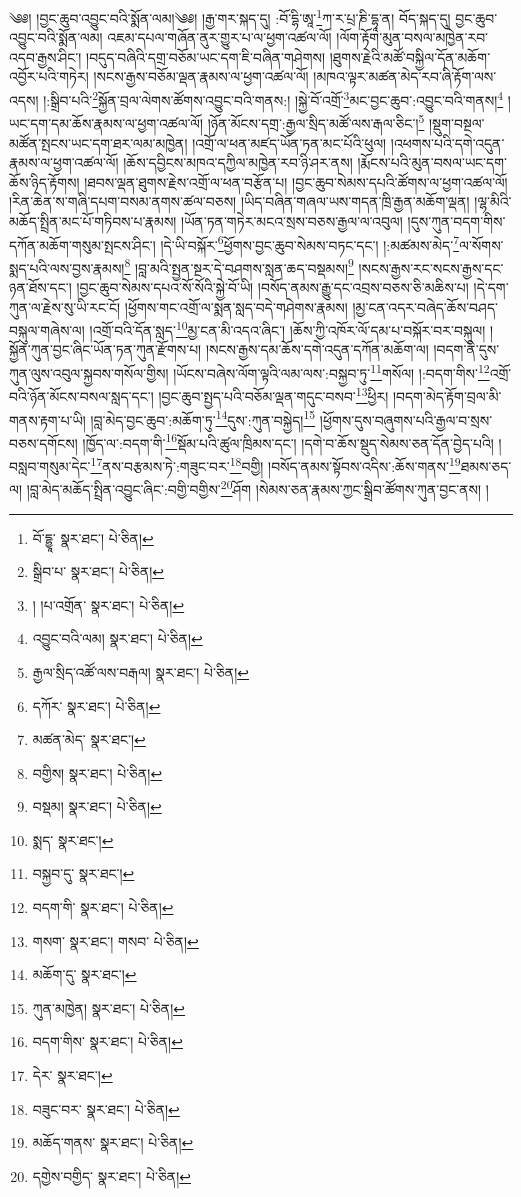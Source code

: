 \setcounter{footnote}{0} 
༄༅། །བྱང་ཆུབ་འབྱུང་བའི་སྨོན་ལམ།༄༅། །རྒྱ་གར་སྐད་དུ། :བོ་དྷི་ཨཱ་\footnote{བོ་དྷྱཱ་  སྣར་ཐང་།  པེ་ཅིན། }ཀ་ར་པྲ་ཎི་དྷཱ་ན། བོད་སྐད་དུ། བྱང་ཆུབ་འབྱུང་བའི་སྨོན་ལམ། འཇམ་དཔལ་གཞོན་ནུར་གྱུར་པ་ལ་ཕྱག་འཚལ་ལོ། །ལོག་རྟོག་མུན་བསལ་མཁྱེན་རབ་འདབ་རྒྱས་ཤིང་། །བདུད་བཞིའི་དགྲ་བཅོམ་ཡང་དག་ཇི་བཞིན་གཤེགས། །ཐུགས་རྗེའི་མཚོ་བསྐྱིལ་དོན་མཆོག་འབྱོར་པའི་གཏེར། །སངས་རྒྱས་བཅོམ་ལྡན་རྣམས་ལ་ཕྱག་འཚལ་ལོ། །མཁའ་ལྟར་མཚན་མེད་རབ་ཞི་རྟོག་ལས་འདས། །:སྒྲིབ་པའི་\footnote{སྒྲིབ་པ་  སྣར་ཐང་།  པེ་ཅིན། }སྐྱོན་བྲལ་ལེགས་ཚོགས་འབྱུང་བའི་གནས:། །སྐྱེ་བོ་འགྲོ་\footnote{། །པ་འགྲོན་  སྣར་ཐང་།  པེ་ཅིན། }མང་བྱང་ཆུབ་:འབྱུང་བའི་གནས།\footnote{འབྱུང་བའི་ལམ།  སྣར་ཐང་།  པེ་ཅིན། } །ཡང་དག་དམ་ཆོས་རྣམས་ལ་ཕྱག་འཚལ་ལོ། །ཉོན་མོངས་དགྲ་:རྒྱལ་སྲིད་མཚོ་ལས་རྒལ་ཅིང་།\footnote{རྒྱལ་སྲིད་འཚོ་ལས་བརྒལ།  སྣར་ཐང་།  པེ་ཅིན། } །སྡུག་བསྔལ་མཚོན་སྤངས་ཡང་དག་ཐར་ལམ་མཁྱེན། །འགྲོ་ལ་ཕན་མཛད་ཡོན་ཏན་མང་པོའི་ཕུལ། །འཕགས་པའི་དགེ་འདུན་རྣམས་ལ་ཕྱག་འཚལ་ལོ། །ཆོས་དབྱིངས་མཁའ་དཀྱིལ་མཁྱེན་རབ་ཉི་ཤར་ནས། །རྨོངས་པའི་མུན་བསལ་ཡང་དག་ཆོས་ཉིད་རྟོགས། །ཐབས་ལྡན་ཐུགས་རྗེས་འགྲོ་ལ་ཕན་བརྩོན་པ། །བྱང་ཆུབ་སེམས་དཔའི་ཚོགས་ལ་ཕྱག་འཚལ་ལོ། །རིན་ཆེན་ས་གཞི་དཔག་བསམ་ནགས་ཚལ་བཅས། །ཡིད་བཞིན་གཞལ་ཡས་གདན་ཁྲི་རྒྱན་མཆོག་ལྡན། །ལྷ་མིའི་མཆོད་སྤྲིན་མང་པོ་གཏིབས་པ་རྣམས། །ཡོན་ཏན་གཏེར་མངའ་སྲས་བཅས་རྒྱལ་ལ་འབུལ། །དུས་ཀུན་བདག་གིས་དཀོན་མཆོག་གསུམ་སྤངས་ཤིང་། །དེ་ཡི་བསྐོར་\footnote{དཀོར་  སྣར་ཐང་།  པེ་ཅིན། }ཕྱོགས་བྱང་ཆུབ་སེམས་བཏང་དང་། །:མཚམས་མེད་\footnote{མཚན་མེད་  སྣར་ཐང་། }ལ་སོགས་སྨད་པའི་ལས་བྱས་རྣམས།\footnote{བགྱིས།  སྣར་ཐང་།  པེ་ཅིན། } །བླ་མའི་སྤྱན་སྔར་དེ་བཤགས་སླན་ཆད་བསྡམས།\footnote{བསྡམ།  སྣར་ཐང་།  པེ་ཅིན། } །སངས་རྒྱས་རང་སངས་རྒྱས་དང་ཉན་ཐོས་དང་། །བྱང་ཆུབ་སེམས་དཔའ་སོ་སོའི་སྐྱེ་བོ་ཡི། །བསོད་ནམས་རྒྱུ་དང་འབྲས་བཅས་ཅི་མཆིས་པ། །དེ་དག་ཀུན་ལ་རྗེས་སུ་ཡི་རང་ངོ། །ཕྱོགས་གང་འགྲོ་ལ་སྨན་སླད་བདེ་གཤེགས་རྣམས། །མྱ་ངན་འདར་བཞེད་ཆོས་བཤད་བསྐུལ་གཞེས་ལ། །འགྲོ་བའི་དོན་སླད་\footnote{སྨད་  སྣར་ཐང་། }མྱ་ངན་མི་འདའ་ཞིང་། །ཆོས་ཀྱི་འཁོར་ལོ་དམ་པ་བསྐོར་བར་བསྐུལ། །སྐྱོན་ཀུན་བྱང་ཞིང་ཡོན་ཏན་ཀུན་རྫོགས་པ། །སངས་རྒྱས་དམ་ཆོས་དགེ་འདུན་དཀོན་མཆོག་ལ། །བདག་ནི་དུས་ཀུན་ལུས་འབུལ་སྐྱབས་གསོལ་གྱིས། །ཡོངས་བཞེས་ལོག་ལྟའི་ལམ་ལས་:བསྐྱབ་ཏུ་\footnote{བསྐྱབ་དུ་  སྣར་ཐང་། }གསོལ། །:བདག་གིས་\footnote{བདག་གི་  སྣར་ཐང་།  པེ་ཅིན། }འགྲོ་བའི་ཉོན་མོངས་བསལ་སླད་དང་། །བྱང་ཆུབ་སྤྱད་པའི་བཅོམ་ལྡན་གདུང་བསབ་\footnote{གསག་  སྣར་ཐང་། གསབ་  པེ་ཅིན། }ཕྱིར། །བདག་མེད་རྟོག་བྲལ་མི་གནས་རྟག་པ་ཡི། །བླ་མེད་བྱང་ཆུབ་:མཆོག་ཏུ་\footnote{མཆོག་དུ་  སྣར་ཐང་། }དུས་:ཀུན་བསྐྱེད།\footnote{ཀུན་མཁྱེན།  སྣར་ཐང་།  པེ་ཅིན། } །ཕྱོགས་དུས་བཞུགས་པའི་རྒྱལ་བ་སྲས་བཅས་དགོངས། །ཁྱོད་ལ་:བདག་གི་\footnote{བདག་གིས་  སྣར་ཐང་།  པེ་ཅིན། }སྡོམ་པའི་ཚུལ་ཁྲིམས་དང་། །དགེ་བ་ཆོས་སྡུད་སེམས་ཅན་དོན་བྱེད་པའི། །བསླབ་གསུམ་དེང་\footnote{དེར་  སྣར་ཐང་། }ནས་བརྩམས་ཏེ་:གཟུང་བར་\footnote{བཟུང་བར་  སྣར་ཐང་།  པེ་ཅིན། }བགྱི། །བསོད་ནམས་སྟོབས་འདིས་:ཆོས་གནས་\footnote{མཆོད་གནས་  སྣར་ཐང་།  པེ་ཅིན། }ཐམས་ཅད་ལ། །བླ་མེད་མཆོད་སྤྲིན་འབྱུང་ཞིང་:བགྱི་བགྱིས་\footnote{དགྱེས་བགྱིད་  སྣར་ཐང་།  པེ་ཅིན། }ཤོག །སེམས་ཅན་རྣམས་ཀྱང་སྒྲིབ་ཚོགས་ཀུན་བྱང་ནས། །
